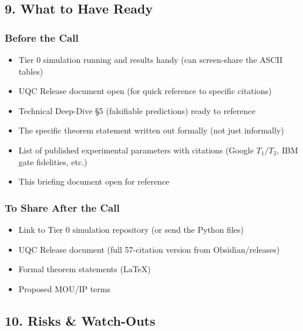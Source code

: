 \documentclass[11pt,a4paper]{article}
\begin{document}
\hrulefill


\subsection{9. What to Have Ready}


\subsubsection{Before the Call}


\begin{itemize}
\item [ ] Tier 0 simulation running and results handy (can screen-share the ASCII tables)
\item [ ] UQC Release document open (for quick reference to specific citations)
\item [ ] Technical Deep-Dive §5 (falsifiable predictions) ready to reference
\item [ ] The specific theorem statement written out formally (not just informally)
\item [ ] List of published experimental parameters with citations (Google $T_1/T_2$, IBM gate fidelities, etc.)
\item [ ] This briefing document open for reference
\end{itemize}


\subsubsection{To Share After the Call}


\begin{itemize}
\item [ ] Link to Tier 0 simulation repository (or send the Python files)
\item [ ] UQC Release document (full 57-citation version from Obsidian/releases)
\item [ ] Formal theorem statements (LaTeX)
\item [ ] Proposed MOU/IP terms
\end{itemize}


\hrulefill


\subsection{10. Risks \& Watch-Outs}
\end{document}

